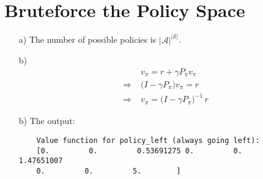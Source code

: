 \documentclass{article}
\begin{document}
\section{Bruteforce the Policy Space}
\begin{enumerate}
	\item[a)] The number of possible policies is $|\mathcal{A}|^{|\mathcal{S}|}$.
	\item[b)] 
	\begin{equation*}
	\begin{split}
	&v_\pi =r + \gamma P_\pi v_\pi\\
	\Rightarrow\; &\big(I - \gamma P_\pi\big)v_\pi=r\\
	\Rightarrow\; &v_\pi=\big(I - \gamma P_\pi\big)^{-1}\,r
	\end{split}
	\end{equation*}
	\item[b)] The output:
	\begin{verbatim}
	Value function for policy_left (always going left):
	[0.         0.         0.53691275 0.         0.         1.47651007
	0.         0.         5.        ]
	

\end{verbatim}
\end{enumerate}
\end{document}
